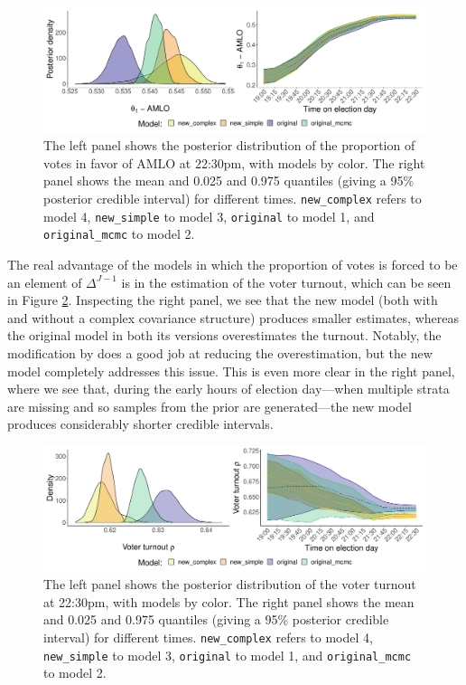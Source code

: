 \documentclass{article}
\begin{document}
\begin{figure}[h]
  \centering
  \includegraphics[width=\textwidth]{../fig/amlo.pdf}
  \caption{The left panel shows the posterior distribution of the proportion of votes in favor of AMLO at 22:30pm, with models by color. The right panel shows the mean and 0.025 and 0.975 quantiles (giving a 95\% posterior credible interval) for different times. \texttt{new\_complex} refers to model 4, \texttt{new\_simple} to model 3, \texttt{original} to model 1, and \texttt{original\_mcmc} to model 2.}
  \label{fig:amlo}
\end{figure}


The real advantage of the models in which the proportion of votes is forced to be an element of $\Delta^{J-1}$ is in the estimation of the voter turnout, which can be seen in Figure \ref{fig:part}. Inspecting the right panel, we see that the new model (both with and without a complex covariance structure) produces smaller estimates, whereas the original model in both its versions overestimates the turnout. Notably, the modification by \citet{diluvi2018} does a good job at reducing the overestimation, but the new model completely addresses this issue. This is even more clear in the right panel, where we see that, during the early hours of election day---when multiple strata are missing and so samples from the prior are generated---the new model produces considerably shorter credible intervals. \\


\begin{figure}[h]
  \centering
  \includegraphics[width=\textwidth]{../fig/part.pdf}
  \caption{The left panel shows the posterior distribution of the voter turnout at 22:30pm, with models by color. The right panel shows the mean and 0.025 and 0.975 quantiles (giving a 95\% posterior credible interval) for different times. \texttt{new\_complex} refers to model 4, \texttt{new\_simple} to model 3, \texttt{original} to model 1, and \texttt{original\_mcmc} to model 2.}
  \label{fig:part}
\end{figure}
\end{document}
